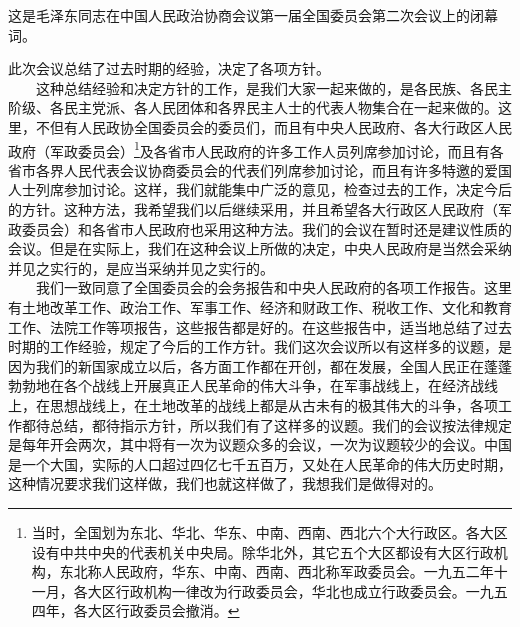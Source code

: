\documentclass[cn,11pt,chinese]{elegantbook}
\begin{document}
\begin{introduction}\item  这是毛泽东同志在中国人民政治协商会议第一届全国委员会第二次会议上的闭幕词。\end{introduction}
此次会议总结了过去时期的经验，决定了各项方针。\\
　　这种总结经验和决定方针的工作，是我们大家一起来做的，是各民族、各民主阶级、各民主党派、各人民团体和各界民主人士的代表人物集合在一起来做的。这里，不但有人民政协全国委员会的委员们，而且有中央人民政府、各大行政区人民政府（军政委员会）\footnote[1]{ 当时，全国划为东北、华北、华东、中南、西南、西北六个大行政区。各大区设有中共中央的代表机关中央局。除华北外，其它五个大区都设有大区行政机构，东北称人民政府，华东、中南、西南、西北称军政委员会。一九五二年十一月，各大区行政机构一律改为行政委员会，华北也成立行政委员会。一九五四年，各大区行政委员会撤消。}及各省市人民政府的许多工作人员列席参加讨论，而且有各省市各界人民代表会议协商委员会的代表们列席参加讨论，而且有许多特邀的爱国人士列席参加讨论。这样，我们就能集中广泛的意见，检查过去的工作，决定今后的方针。这种方法，我希望我们以后继续采用，并且希望各大行政区人民政府（军政委员会）和各省市人民政府也采用这种方法。我们的会议在暂时还是建议性质的会议。但是在实际上，我们在这种会议上所做的决定，中央人民政府是当然会采纳并见之实行的，是应当采纳并见之实行的。\\
　　我们一致同意了全国委员会的会务报告和中央人民政府的各项工作报告。这里有土地改革工作、政治工作、军事工作、经济和财政工作、税收工作、文化和教育工作、法院工作等项报告，这些报告都是好的。在这些报告中，适当地总结了过去时期的工作经验，规定了今后的工作方针。我们这次会议所以有这样多的议题，是因为我们的新国家成立以后，各方面工作都在开创，都在发展，全国人民正在蓬蓬勃勃地在各个战线上开展真正人民革命的伟大斗争，在军事战线上，在经济战线上，在思想战线上，在土地改革的战线上都是从古未有的极其伟大的斗争，各项工作都待总结，都待指示方针，所以我们有了这样多的议题。我们的会议按法律规定是每年开会两次，其中将有一次为议题众多的会议，一次为议题较少的会议。中国是一个大国，实际的人口超过四亿七千五百万，又处在人民革命的伟大历史时期，这种情况要求我们这样做，我们也就这样做了，我想我们是做得对的。\\
\end{document}
